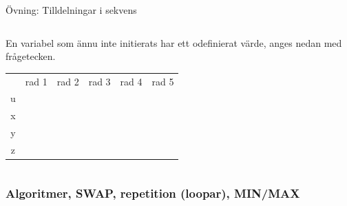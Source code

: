 \documentclass{lecturenotes}
\begin{document}
\begin{Slide}{Övning: Tilldelningar i sekvens}\footnotesize
\begin{columns}
\begin{column}{0.6\textwidth}

\scriptsize En variabel som ännu inte initierats har ett odefinierat värde, anges nedan med frågetecken.
\begin{table}[] 
\centering\scriptsize
\newcommand{\mybox}[1]{\raisebox{-0.5mm}{\framebox(21,14){#1}}\vspace{0.5mm}}
\begin{tabular}{cccccc}
 & rad 1 & rad 2 & rad 3 & rad 4  & rad 5\\ 
u& \mybox{? } &  \mybox{}   &   \mybox{}   & \mybox{} & \mybox{} \\
x& \mybox{? } &  \mybox{}   &   \mybox{}   & \mybox{} & \mybox{} \\
y& \mybox{? } &  \mybox{}   &   \mybox{}   & \mybox{} & \mybox{} \\
z& \mybox{? } &  \mybox{}   &   \mybox{}   & \mybox{} & \mybox{} \\
\end{tabular}
\end{table}

\end{column}
\end{columns}
\end{Slide}

\subsubsection{Algoritmer, SWAP, repetition (loopar), MIN/MAX}
\end{document}
